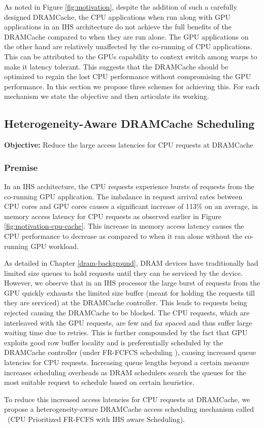As noted in Figure \ref{fig:motivation}, despite the addition of such a carefully designed DRAMCache, the CPU applications when run along with GPU applications in an IHS architecture do not achieve the full benefits of the DRAMCache compared to when they are run alone. The GPU applications on the other hand are relatively unaffected by the co-running of CPU applications. This can be attributed to the GPUs capability to context switch among warps to make it latency tolerant. This suggests that the DRAMCache should be optimized to regain the lost CPU performance without compromising the GPU performance. In this section we propose three schemes for achieving this. For each mechanism we state the objective and then articulate its working.


\subsection{Heterogeneity-Aware DRAMCache Scheduling} 
\textbf{Objective:} Reduce the large access latencies for CPU requests at DRAMCache
\subsubsection{Premise}
In an IHS architecture, the CPU requests experience bursts of requests from the co-running GPU application. The imbalance in request arrival rates between CPU cores and GPU cores causes a significant increase of 113\% on an average, in memory access latency for CPU requests as observed earlier in Figure \ref{fig:motivation-cpu-cache}. This increase in memory access latency causes the CPU performance to decrease as compared to when it ran alone without the co-running GPU workload.
\par As detailed in Chapter \ref{dram-background}, DRAM devices have traditionally had limited size queues to hold requests until they can be serviced by the device. However, we observe that in an IHS processor the large burst of requests from the GPU quickly exhausts the limited size buffer (meant for holding the requests till they are serviced) at the DRAMCache controller. This leads to requests being rejected causing the DRAMCache to be blocked. 
The CPU requests, which are interleaved with the GPU requests, are few and far spaced and thus suffer large waiting time due to retries. This is further compounded by the fact that GPU exploits good row buffer locality and is preferentially scheduled by the DRAMCache controller (under FR-FCFCS scheduling \cite{sms}), causing increased queue latencies for CPU requests. Increasing queue lengths beyond a certain measure increases scheduling overheads as DRAM schedulers search the queues for the most suitable request to schedule based on certain heuristics.
\par To reduce this increased access latencies for CPU requests at DRAMCache, we propose a heterogeneity-aware DRAMCache access scheduling mechanism called \prioname\ (CPU Prioritized FR-FCFS with IHS aware Scheduling).

